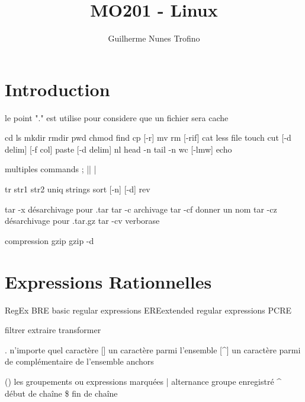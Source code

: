 \documentclass{article}
\title{MO201 - Linux}
\author{Guilherme Nunes Trofino}
\begin{document}
\maketitle

\newpage\tableofcontents

\section{Introduction}

le point "." est utilise pour considere que un fichier sera cache

cd
ls
mkdir
rmdir
pwd
chmod
find
cp [-r]
mv
rm [-rif]
cat
less
file
touch
cut [-d delim] [-f col]
paste [-d delim]
nl
head -n
tail -n
wc [-lmw]
echo

multiples commands
;
||
|


tr str1 str2
uniq
strings
sort [-n] [-d]
rev


tar -x désarchivage pour .tar
tar -c archivage
tar -cf donner un nom
tar -cz désarchivage pour .tar.gz
tar -cv verborase

compression
gzip
gzip -d


\section{Expressions Rationnelles}
RegEx
    BRE basic regular expressions
    EREextended regular expressions
    PCRE

filtrer
extraire
transformer

. n'importe quel caractère
[] un caractère parmi l'ensemble
[^] un caractère parmi de complémentaire de l'ensemble
anchors

() les groupements ou expressions marquées
| alternance
\1 groupe enregistré
^ début de chaîne
\$ fin de chaîne
\end{document}

